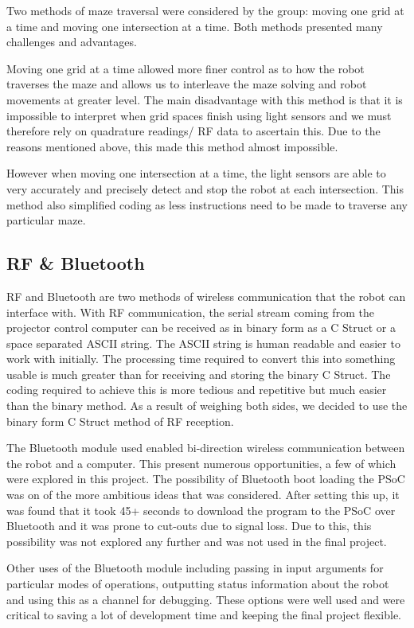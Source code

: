\documentclass{article}
\begin{document}
Two methods of maze traversal were considered by the group: moving one grid at a time and moving one intersection at a time. Both methods presented many challenges and advantages.

Moving one grid at a time allowed more finer control as to how the robot traverses the maze and allows us to interleave the maze solving and robot movements at greater level. The main disadvantage with this method is that it is impossible to interpret when grid spaces finish using light sensors and we must therefore rely on quadrature readings/ RF data to ascertain this. Due to the reasons mentioned above, this made this method almost impossible.

However when moving one intersection at a time, the light sensors are able to very accurately and precisely detect and stop the robot at each intersection. This method also simplified coding as less instructions need to be made to traverse any particular maze.

\subsection{RF \& Bluetooth}

RF and Bluetooth are two methods of wireless communication that the robot can interface with. With RF communication, the serial stream coming from the projector control computer can be received as in binary form as a C Struct or a space separated ASCII string. The ASCII string is human readable and easier to work with initially. The processing time required to convert this into something usable is much greater than for receiving and storing the binary C Struct. The coding required to achieve this is more tedious and repetitive but much easier than the binary method. As a result of weighing both sides, we decided to use the binary form C Struct method of RF reception.

The Bluetooth module used enabled bi-direction wireless communication between the robot and a computer. This present numerous opportunities, a few of which were explored in this project. The possibility of Bluetooth boot loading the PSoC was on of the more ambitious ideas that was considered. After setting this up, it was found that it took 45+ seconds to download the program to the PSoC over Bluetooth and it was prone to cut-outs due to signal loss. Due to this, this possibility was not explored any further and was not used in the final project.

Other uses of the Bluetooth module including passing in input arguments for particular modes of operations, outputting status information about the robot and using this as a channel for debugging. These options were well used and were critical to saving a lot of development time and keeping the final project flexible.
\end{document}
